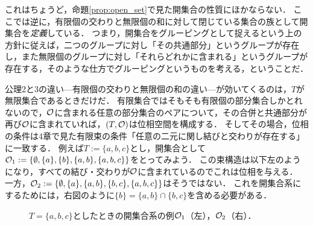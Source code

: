 \documentclass[11pt,a4paper, dvipdfmx]{jsarticle}
\begin{document}
これはちょうど，命題\ref{prop:open_set}で見た開集合の性質にほかならない．
ここでは逆に，有限個の交わりと無限個の和に対して閉じている集合の族として開集合を\emph{定義}している．
つまり，開集合をグルーピングとして捉えるという上の方針に従えば，二つのグループに対し「その共通部分」というグループが存在し，また無限個のグループに対し「それらどれかに含まれる」というグループが存在する，そのような仕方でグルーピングというものを考える，ということだ．

公理2と3の違い---有限個の交わりと無限個の和の違い---が効いてくるのは，$T$が無限集合であるときだけだ．
有限集合ではそもそも有限個の部分集合しかとれないので，$\mathcal{O}$に含まれる任意の部分集合のペアについて，その合併と共通部分が再び$\mathcal{O}$に含まれていれば，$(T, \mathcal{O})$は位相空間を構成する．
そしてその場合，位相の条件は4章で見た有限束の条件「任意の二元に関し結びと交わりが存在する」に一致する．
例えば$T:=\{a, b, c\}$とし，開集合として$\mathcal{O}_1 := \{ \emptyset, \{a \}, \{b\}, \{a,b\}, \{a,b,c\} \}$をとってみよう．
この束構造は以下左のようになり，すべての結び・交わりが$\mathcal{O}$に含まれているのでこれは位相を与える．
一方，$\mathcal{O}_2 := \{ \emptyset, \{a \}, \{a,b\}, \{b,c\}, \{a,b,c\} \}$はそうではない．
これを開集合系にするためには，右図のように$\{b\} =  \{a,b\} \cap \{b,c\}$を含める必要がある．
\begin{figure}[h]
    \centering
    \caption{$T = \{a, b, c\}$としたときの開集合系の例$\mathcal{O}_1$（左），$\mathcal{O}_2$（右）．}
    \label{fig:3bool} 
\end{figure}
\end{document}
